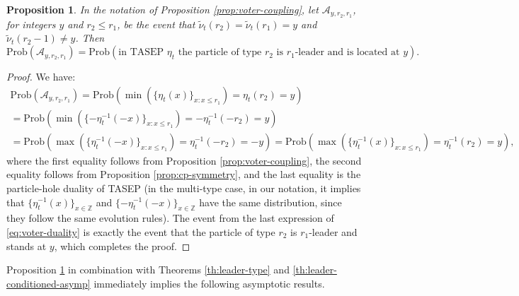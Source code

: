 \documentclass[11pt,reqno]{amsart}
\newtheorem{prop}[thm]{Proposition}
\theoremstyle{definition}
\theoremstyle{remark}
\theoremstyle{remark}
\def\leq{\leqslant}
\renewcommand\le{\leq}
\def\Z{\mathbb Z}
\numberwithin{equation}{section}
\begin{document}
	
	\begin{prop}
		\label{prop:voter-tasep-dual}
		In the notation of Proposition \ref{prop:voter-coupling},
		let $\mathcal{A}_{y,r_2,r_1}$, for integers $y$ and $r_2 \le r_1$, be the event that $\tilde \nu_t (r_2) = \tilde \nu_t (r_1) = y$ and $\tilde \nu_t (r_2-1) \ne y$. Then 
		$$
		\mathrm{Prob} \left( \mathcal{A}_{y,r_2,r_1} \right) = \mathrm{Prob} \left( \mbox{in TASEP $\eta_t$ the particle of type $r_2$ is $r_1$-leader and is located at $y$} \right).
		$$
	\end{prop}
	
	\begin{proof}
		
		We have:
		\begin{multline}
			\label{eq:voter-duality}
			\mathrm{Prob} \left( \mathcal{A}_{y,r_2,r_1} \right) 
			= 
			\mathrm{Prob} \left( \min \left( \{ \eta_t (x) \}_{x: x \le r_1} \right)
			= \eta_t (r_2) = y \right)
			\\ =
			\mathrm{Prob} \left( \min \left( \{ -\eta_t^{-1} (-x) \}_{x: x \le r_1} \right) = - \eta_t^{-1} (-r_2) = y \right)
			\\ =
			\mathrm{Prob} \left( \max \left( \{ \eta_t^{-1} (-x)  \}_{x: x \le r_1} \right) = \eta_t^{-1} (-r_2) = - y \right)
			=
			\mathrm{Prob} \left( \max \left( \{ \eta_t^{-1} (x) \}_{x: x \le r_1} \right) = \eta_t^{-1} (r_2) = y \right),
		\end{multline}
		where the first equality follows from Proposition \ref{prop:voter-coupling}, the second equality follows from Proposition \ref{prop:cp-symmetry}, and the last equality is the particle-hole duality of TASEP (in the multi-type case, in our notation, it implies that $\{ \eta_t^{-1} (x) \}_{x \in \Z} $ and $\{ -\eta_t^{-1} (-x) \}_{x \in \Z} $ have the same distribution, since they follow the same evolution rules). The event from the last expression of \eqref{eq:voter-duality} is exactly the event that the particle of type $r_2$ is $r_1$-leader and stands at $y$, which completes the proof.   
	\end{proof}
	
	Proposition \ref{prop:voter-tasep-dual} in combination with Theorems \ref{th:leader-type} and \ref{th:leader-conditioned-asymp} immediately implies the following asymptotic results.
	
\end{document}

